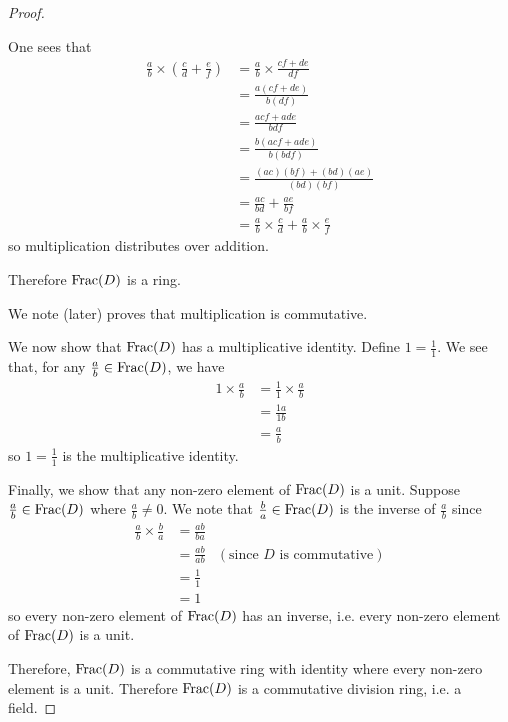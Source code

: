 \begin{proof}
\begin{itemize}
        One sees that
        \begin{align*}
            \frac ab \times \left(\frac cd + \frac ef\right) &= \frac ab \times \frac{cf + de}{df}\\
            &= \frac{a(cf + de)}{b(df)}\\
            &= \frac{acf + ade}{bdf}\\
            &= \frac{b(acf + ade)}{b(bdf)}\\
            &= \frac{(ac)(bf) + (bd)(ae)}{(bd)(bf)}\\
            &= \frac{ac}{bd} + \frac {ae}{bf}\\
            &= \frac ab \times \frac cd + \frac ab \times \frac ef
        \end{align*}
        so multiplication distributes over addition.
    \end{itemize}
    Therefore $\mathrm{Frac}(D)$ is a ring.

    We note  (later) proves that multiplication is commutative.

    We now show that $\mathrm{Frac}(D)$ has a multiplicative identity. Define $1 = \frac 11$. We see that, for any $\frac ab \in \mathrm{Frac}(D)$, we have
    \begin{align*}
        1 \times \frac ab &= \frac 11 \times \frac ab\\
        &= \frac {1a}{1b}\\
        &= \frac ab
    \end{align*}
    so $1 = \frac 11$ is the multiplicative identity.

    Finally, we show that any non-zero element of $\mathrm{Frac}(D)$ is a unit. Suppose $\frac ab \in \mathrm{Frac}(D)$ where $\frac ab \neq 0$. We note that $\frac ba \in \mathrm{Frac}(D)$ is the inverse of $\frac ab$ since
    \begin{align*}
        \frac ab \times \frac ba &= \frac{ab}{ba}\\
        &= \frac{ab}{ab} & (\text{since } D \text{ is commutative})\\
        &= \frac11\\
        &= 1
    \end{align*}
    so every non-zero element of $\mathrm{Frac}(D)$ has an inverse, i.e. every non-zero element of $\mathrm{Frac}(D)$ is a unit.

    Therefore, $\mathrm{Frac}(D)$ is a commutative ring with identity where every non-zero element is a unit. Therefore $\mathrm{Frac}(D)$ is a commutative division ring, i.e. a field.
\end{proof}

